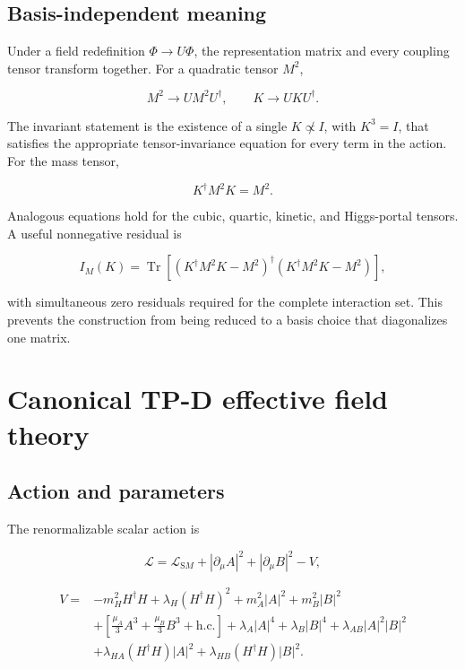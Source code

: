 \documentclass[
]{article}
\begin{document}
\hypertarget{basis-independent-meaning}{%
\subsection{Basis-independent meaning}\label{basis-independent-meaning}}

Under a field redefinition \(\Phi\to U\Phi\), the representation matrix
and every coupling tensor transform together. For a quadratic tensor
\(M^2\),

\[
M^2\to U M^2 U^\dagger,\qquad K\to UKU^\dagger .
\]

The invariant statement is the existence of a single \(K\not\propto I\),
with \(K^3=I\), that satisfies the appropriate tensor-invariance
equation for every term in the action. For the mass tensor,

\[
K^\dagger M^2K=M^2.
\]

Analogous equations hold for the cubic, quartic, kinetic, and
Higgs-portal tensors. A useful nonnegative residual is

\[
I_M(K)=\operatorname{Tr}\!\left[
(K^\dagger M^2K-M^2)^\dagger(K^\dagger M^2K-M^2)
\right],
\]

with simultaneous zero residuals required for the complete interaction
set. This prevents the construction from being reduced to a basis choice
that diagonalizes one matrix.

\hypertarget{canonical-tp-d-effective-field-theory}{%
\section{Canonical TP-D effective field
theory}\label{canonical-tp-d-effective-field-theory}}

\hypertarget{action-and-parameters}{%
\subsection{Action and parameters}\label{action-and-parameters}}

The renormalizable scalar action is

\[
\mathcal L=\mathcal L_{\mathrm SM}+|\partial_\mu A|^2+|\partial_\mu B|^2-V,
\]

\[
\begin{aligned}
V={}&-m_H^2H^\dagger H+\lambda_H(H^\dagger H)^2
+m_A^2|A|^2+m_B^2|B|^2\\
&+\left[\frac{\mu_A}{3}A^3+\frac{\mu_B}{3}B^3+\mathrm{h.c.}\right]
+\lambda_A|A|^4+\lambda_B|B|^4+\lambda_{AB}|A|^2|B|^2\\
&+\lambda_{HA}(H^\dagger H)|A|^2
+\lambda_{HB}(H^\dagger H)|B|^2.
\end{aligned}
\]
\end{document}
